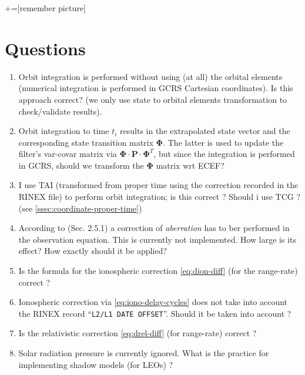 +=[remember picture]
\everymath{\displaystyle}

\section{Questions}
\begin{enumerate}
  \item Orbit integration is performed without using (at all) the orbital 
    elements (numerical integration is performed in GCRS Cartesian coordinates). 
    Is this approach correct? (we only use state to orbital elements 
    transformation to check/validate results).

  \item Orbit integration to time $t_i$ results in the extrapolated state 
    vector and the corresponding state transition matrix $\bm{\Phi}$. The latter 
    is used to update the filter's var-covar matrix via $\bm{\Phi} \cdot \bm{P} \cdot \bm{\Phi}^T$,
    but since the integration is performed in GCRS, should we transform the 
    $\bm{\Phi}$ matrix wrt ECEF?

  \item I use TAI (transformed from proper time using the correction recorded in 
    the RINEX file) to perform orbit integration; is this correct ? Should i
    use TCG ? (see \ref{ssec:coordinate-proper-time})

  \item According to \cite{lemoine-2016} (Sec. 2.5.1) a correction of \emph{aberration} 
    has to ber performed in the observation equation. This is currently not 
    implemented. How large is its effect? How exactly should it be applied?

  \item Is the formula for the ionospheric correction \ref{eq:dion-diff} (for 
    the range-rate) correct ?

  \item Ionospheric correction via \ref{eq:iono-delay-cycles} does not take 
    into account the RINEX record ``\texttt{L2/L1 DATE OFFSET}''. Should it 
    be taken into account ?

  \item Is the relativistic correction \ref{eq:drel-diff} (for range-rate) 
    correct ?

  \item Solar radiation pressure is currently ignored. What is the practice 
    for implementing shadow models (for LEOs) ?


\end{enumerate}
